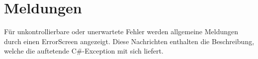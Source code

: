 %



\section{Meldungen}
\label{Abschnitt:Ausnahmen:Meldungen}

Für unkontrollierbare oder unerwartete Fehler werden allgemeine Meldungen durch einen ErrorScreen angezeigt. Diese Nachrichten enthalten die Beschreibung, welche die auftetende C\#-Exception mit sich liefert.










